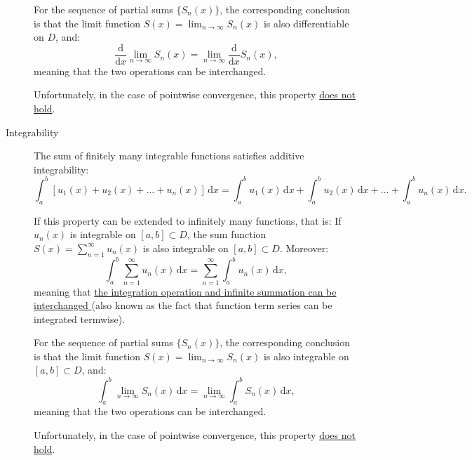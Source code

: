 \documentclass[11pt]{../../TexTemplate/elegantbook}
\begin{document}
\begin{description}
    For the sequence of partial sums \( \{ S_n(x) \} \), 
    the corresponding conclusion is that the limit function 
    \( S(x) = \lim_{n \to \infty} S_n(x) \) is also differentiable on \( D \), and:
    \[
    \frac{\mathrm{d}}{\mathrm{d}x} \lim_{n \to \infty} S_n(x) = \lim_{n \to \infty} \frac{\mathrm{d}}{\mathrm{d}x} S_n(x),
    \]
    meaning that the two operations can be interchanged.

    Unfortunately, in the case of pointwise convergence, this property \underline{does not hold}.


    \item[Integrability]
    The sum of finitely many integrable functions satisfies additive integrability:
    \[
    \int_a^b [u_1(x) + u_2(x) + \dots + u_n(x)] \, \mathrm{d}x 
    = \int_a^b u_1(x) \, \mathrm{d}x + \int_a^b u_2(x) \, \mathrm{d}x + \dots + \int_a^b u_n(x) \, \mathrm{d}x.
    \]

    If this property can be extended to infinitely many functions, that is:
    If \( u_n(x) \) is integrable on \( [a, b] \subset D \), 
    the sum function \( S(x) = \sum_{n=1}^\infty u_n(x) \) is also integrable on \( [a, b] \subset D \). Moreover:
    \[
    \int_a^b \sum_{n=1}^\infty u_n(x) \, \mathrm{d}x = \sum_{n=1}^\infty \int_a^b u_n(x) \, \mathrm{d}x,
    \]
    meaning that \underline{the integration operation and infinite summation can be interchanged }
    (also known as the fact that function term series can be integrated termwise).

    For the sequence of partial sums \( \{ S_n(x) \} \), 
    the corresponding conclusion is that the limit function \( S(x) = \lim_{n \to \infty} S_n(x) \) is also integrable on \( [a, b] \subset D \), and:
    \[
    \int_a^b \lim_{n \to \infty} S_n(x) \, \mathrm{d}x = \lim_{n \to \infty} \int_a^b S_n(x) \, \mathrm{d}x,
    \]
    meaning that the two operations can be interchanged.

    Unfortunately, in the case of pointwise convergence, this property \underline{does not hold}.
\end{description}
\end{document}
